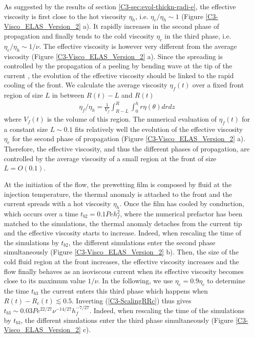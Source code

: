 As      suggested       by      the      results       of      section
\ref{C3-sec:evol-thickn-radi-e},  the  effective  viscosity  is  first
close  to the  hot viscosity  $\eta_h$, i.e.   $\eta_e/\eta_h \sim  1$
(Figure \ref{C3-Visco_ELAS_Version_2} a).  It rapidly increases in the
second phase  of propagation and  finally tends to the  cold viscosity
$\eta_c$ in  the third  phase, i.e.   $\eta_e/\eta_h \sim  1/\nu$. The
effective  viscosity  is  however  very  different  from  the  average
viscosity   (Figure  \ref{C3-Visco_ELAS_Version_2}   a).   Since   the
spreading is  controlled by  the propagation of  a peeling  by bending
wave at the tip of the current \citep{Lister:2013ia}, the evolution of
the effective viscosity  should be linked to the rapid  cooling of the
front. We  calculate the  average viscosity  $\eta_f(t)$ over  a fixed
front region of size $L$ in between $R(t)-L$ and $R(t)$
\begin{eqnarray}
  \eta_f/\eta_h =
  \frac{1}{V_f}\int_{R-L}^{R}\int_0^{h}  r  \eta(\theta)
  dr dz \label{C3-front-visco}
\end{eqnarray}
where $V_f(t)$ is the volume of this region.  The numerical evaluation
of $\eta_f(t)$ for  a constant size $L \sim 0.1$  fits relatively well
the evolution of the effective viscosity $\eta_e$ for the second phase
of propagation  (Figure \ref{C3-Visco_ELAS_Version_2}  a).  Therefore,
the effective viscosity, and thus the different phases of propagation,
are controlled by the average viscosity of a small region at the front
of size $L=O(0.1)$.

At the  initiation of  the flow,  the prewetting  film is  composed by
fluid at the injection temperature, the thermal anomaly is attached to
the front and the current spreads  with a hot viscosity $\eta_h$. Once
the  film  has  cooled  by   conduction,  which  occurs  over  a  time
$t_{b2}=0.1Peh_f^2$, where the numerical prefactor has been matched to
the simulations, the thermal anomaly detaches from the current tip and
the effective  viscosity starts  to increase.  Indeed,  when rescaling
the time  of the  simulations by  $t_{b2}$, the  different simulations
enter      the      second      phase      simultaneously      (Figure
\ref{C3-Visco_ELAS_Version_2} b).   Then, the  size of the  cold fluid
region at the  front increases, the effective  viscosity increases and
the flow finally  behaves as an isoviscous current  when its effective
viscosity  becomes  close  to  its  maximum  value  $1/\nu$.   In  the
following, we use $\eta_e =  0.9\eta_c$ to determine the time $t_{b3}$
the   current   enters   this   third   phase   which   happens   when
$R(t)-R_c(t)  \lesssim  0.5$.   Inverting  (\ref{C3-ScalingRRc})  thus
gives  $t_{b3}\sim  0.03 Pe^{22/27}\nu^{-14/27}h_f^{-7/27}$.   Indeed,
when rescaling the time of  the simulations by $t_{b3}$, the different
simulations   enter    the   third   phase    simultaneously   (Figure
\ref{C3-Visco_ELAS_Version_2} c).

